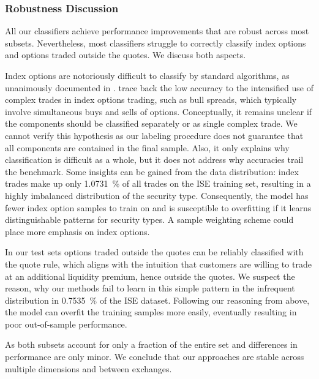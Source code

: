 \subsubsection{Robustness Discussion}\label{sec:robustness-discussion}

All our classifiers achieve performance improvements that are robust across most subsets. Nevertheless, most classifiers struggle to correctly classify index options and options traded outside the quotes. We discuss both aspects.

Index options are notoriously difficult to classify by standard algorithms, as unanimously documented in \textcites[][898--899]{savickasInferringDirectionOption2003}[][22]{grauerOptionTradeClassification2022}. \textcite[][898--898]{savickasInferringDirectionOption2003} trace back the low accuracy to the intensified use of complex trades in index options trading, such as bull spreads, which typically involve simultaneous buys and sells of options. Conceptually, it remains unclear if the components should be classified separately or as single complex trade. We cannot verify this hypothesis as our labeling procedure does not guarantee that all components are contained in the final sample. Also, it only explains why classification is difficult as a whole, but it does not address why accuracies trail the benchmark. Some insights can be gained from the data distribution: index trades make up only \SI{1.0731}{\percent} of all trades on the \gls{ISE} training set, resulting in a highly imbalanced distribution of the security type. Consequently, the model has fewer index option samples to train on and is susceptible to overfitting if it learns distinguishable patterns for security types. A sample weighting scheme could place more emphasis on index options. 

In our test sets options traded outside the quotes can be reliably classified with the quote rule, which aligns with the intuition that customers are willing to trade at an additional liquidity premium, hence outside the quotes. We suspect the reason, why our methods fail to learn in this simple pattern in the infrequent distribution in \SI{0.7535}{\percent} of the \gls{ISE} dataset. Following our reasoning from above, the model can overfit the training samples more easily, eventually resulting in poor out-of-sample performance. 

As both subsets account for only a fraction of the entire set and differences in performance are only minor. We conclude that our approaches are stable across multiple dimensions and between exchanges.

